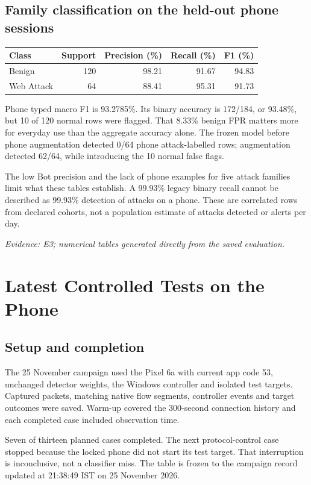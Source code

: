 \documentclass[11pt,a4paper]{article}
\newcommand{\source}[1]{{\small\textit{Evidence: #1.}\par}}
\newcommand{\chapterpage}[1]{\clearpage\section{#1}}
\begin{document}
\subsection*{Family classification on the held-out phone sessions}
\begin{center}\small
\begin{tabular}{@{}lrrrr@{}}
\toprule Class & Support & Precision (\%) & Recall (\%) & F1 (\%)\\\midrule
Benign & 120 & 98.21 & 91.67 & 94.83 \\
Web Attack & 64 & 88.41 & 95.31 & 91.73 \\
\bottomrule
\end{tabular}
\end{center}
Phone typed macro F1 is 93.2785\%. Its binary accuracy is 172/184, or 93.48\%,
but 10 of 120 normal rows were flagged. That 8.33\% benign FPR matters more for
everyday use than the aggregate accuracy alone. The frozen model before phone
augmentation detected 0/64 phone attack-labelled rows; augmentation detected 62/64,
while introducing the 10 normal false flags.

The low Bot precision and the lack of phone examples for five attack families limit
what these tables establish. A 99.93\% legacy binary recall cannot be described as
99.93\% detection of attacks on a phone. These are correlated rows from declared
cohorts, not a population estimate of attacks detected or alerts per day.
\source{E3; numerical tables generated directly from the saved evaluation}

\chapterpage{Latest Controlled Tests on the Phone}
\subsection*{Setup and completion}
The 25 November campaign used the Pixel 6a with current app code 53, unchanged detector
weights, the Windows controller and isolated test targets. Captured packets, matching
native flow segments, controller events and target outcomes were saved. Warm-up covered
the 300-second connection history and each completed case included observation time.

Seven of thirteen planned cases completed. The next protocol-control case stopped
because the locked phone did not start its test target. That interruption is inconclusive,
not a classifier miss. The table is frozen to the campaign record updated at
21:38:49 IST on 25 November 2026.
\end{document}
